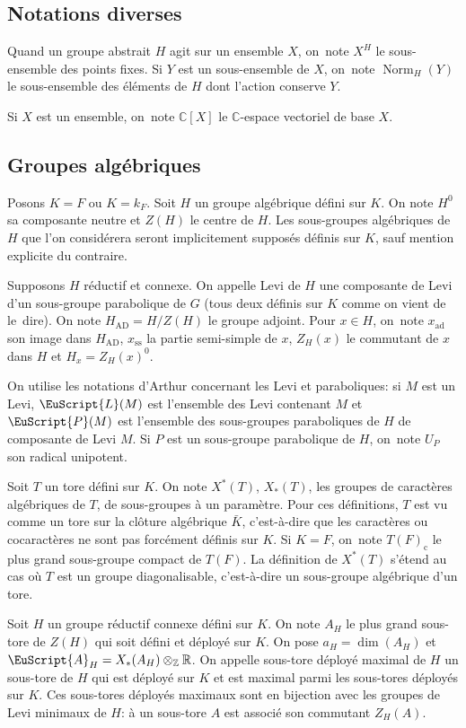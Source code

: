 \documentclass[JEP,XML,SOM,Unicode,francais]{cedram}
\let\mathcal \EuScript
\newcommand{\AD}{\mathrm{AD}}
\newcommand{\rc}{\mathrm{c}}
\newcommand{\rss}{\mathrm{ss}}
\DeclareMathOperator{\ad}{ad}
\DeclareMathOperator{\Norm}{Norm}
\newcommand{\cA}{\mathcal{A}}
\newcommand{\cL}{\mathcal{L}}
\newcommand{\cP}{\mathcal{P}}
\newcommand{\CC}{\mathbb{C}}
\newcommand{\ZZ}{\mathbb{Z}}
\newcommand{\RR}{\mathbb{R}}
\theoremstyle{plain}
\theoremstyle{definition}
\begin{document}
\subsection{Notations diverses}

Quand un groupe abstrait $H$ agit sur un ensemble $X$, on~note $X^{H}$ le sous-ensemble des points fixes. Si $Y$ est un sous-ensemble de $X$, on~note $\Norm_{H}(Y)$ le sous-ensemble des éléments de $H$ dont l'action conserve $Y$.

Si $X$ est un ensemble, on~note $\CC[X]$ le $\CC$-espace vectoriel de base $X$.

\subsection{Groupes algébriques}\label{groupesalgebriques}

Posons $K=F$ ou $K=k_{F}$. Soit $H$ un groupe algébrique défini sur $K$. On note $H^0$ sa composante neutre et $Z(H)$ le centre de $H$. Les sous-groupes algébriques de $H$ que l'on considérera seront implicitement supposés définis sur $K$, sauf mention explicite du contraire.

Supposons $H$ réductif et connexe. On appelle Levi de $H$ une composante de Levi d'un sous-groupe parabolique de $G$ (tous deux définis sur $K$ comme on vient de le~dire). On note $H_{\AD}=H/Z(H)$ le groupe adjoint. Pour $x\in H$, on~note $x_{\ad}$ son image dans $H_{\AD}$, $x_{\rss}$ la partie semi-simple de $x$, $Z_{H}(x)$ le commutant de $x$ dans $H$ et $H_{x}=Z_{H}(x)^0$.

On utilise les notations d'Arthur concernant les Levi et paraboliques: si $M$ est un Levi, $\cL(M)$ est l'ensemble des Levi contenant $M$ et $\cP(M)$ est l'ensemble des sous-groupes paraboliques de $H$ de composante de Levi $M$. Si $P$ est un sous-groupe parabolique de $H$, on~note $U_{P}$ son radical unipotent.

Soit $T$ un tore défini sur $K$. On note $X^{*}(T)$, \resp $X_{*}(T)$, les groupes de caractères algébriques de $T$, \resp de sous-groupes à un paramètre. Pour ces définitions, $T$ est vu comme un tore sur la clôture algébrique $\bar{K}$, c'est-à-dire que les caractères ou cocaractères ne sont pas forcément définis sur $K$. Si $K=F$, on~note $T(F)_{\rc}$ le plus grand sous-groupe compact de $T(F)$. La définition de $X^*(T)$ s'étend au cas où $T$ est un groupe diagonalisable, c'est-à-dire un sous-groupe algébrique d'un tore.

Soit $H$ un groupe réductif connexe défini sur $K$. On note $A_{H}$ le plus grand sous-tore de $Z(H)$ qui soit défini et déployé sur $K$. On pose $a_{H}=\dim(A_{H})$ et $\cA_{H}=X_{*}(A_{H})\otimes_{\ZZ}\RR$. On appelle sous-tore déployé maximal de $H$ un sous-tore de $H$ qui est déployé sur $K$ et est maximal parmi les sous-tores déployés sur $K$. Ces sous-tores déployés maximaux sont en bijection avec les groupes de Levi minimaux de $H$: à un sous-tore $A$ est associé son commutant $Z_{H}(A)$.
\end{document}
